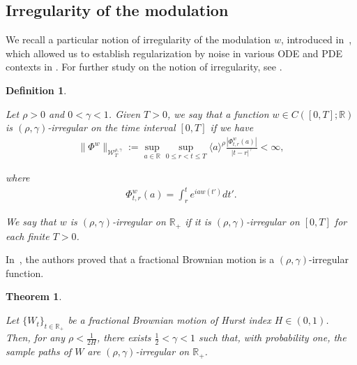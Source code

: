 \documentclass[letterpaper, 11pt,  reqno]{amsart}
\newtheorem{definition}[theorem]{Definition}
\newtheorem{oldtheorem}{Theorem}
\newcommand{\1}{\hspace{0.5mm}\text{I}\hspace{0.5mm}}
\newcommand{\noi}{\noindent}
\newcommand{\R}{\mathbb{R}}
\newcommand{\g}{\gamma}
\newcommand{\W}{\mathcal{W}}
\numberwithin{equation}{section}
\numberwithin{theorem}{section}
\begin{document}
 














\subsection{Irregularity of the modulation}

We recall a particular notion of irregularity of the modulation $w$, 
introduced in~\cite{CatellierGubinelli, CG1},
which allowed us 
 to establish regularization by noise  in various  ODE and PDE contexts
in \cite{CatellierGubinelli,CG1, CGLLO1, CGLLO2}.
For further study on the notion of irregularity, 
see  \cite{GG, RT}.



\begin{definition}
\label{DEF:ir}
\rm

Let $\rho>0$ and  $0 < \g < 1$.
Given $T > 0$, we say that a function $w\in C([0,T];\R)$ is $(\rho,\g)$-irregular 
on the time interval $[0, T]$  if we have
\begin{align}
\|\Phi^w\|_{  \W^{\rho,\g}_T} 
:= \sup_{a\in \R} \sup_{0\leq r < t\leq T} \langle a \rangle^\rho \frac{|\Phi^w_{t,r}(a)|}{|t-r|^\g} 
< \infty, 
\label{rho1}
\end{align}


\noi
where 
\begin{align}
\Phi^w_{t,r}(a)
=\int_r^t e^{i  a w(t') } d t'.
\label{rho2}
\end{align}


\noi
We say that $w$ is 
$(\rho,\g)$-irregular 
on $\R_+$  if it is 
$(\rho,\g)$-irregular 
on $[0, T]$ for each finite $T > 0$.


\end{definition}









In~\cite{CatellierGubinelli}, 
the authors proved that a fractional Brownian motion is a $(\rho,\g)$-irregular function.
 
 
\begin{oldtheorem}
\label{THM:A}

Let $\{W_t\}_{t\in \R_+}$ be a fractional Brownian motion 
of Hurst index $H\in(0,1)$.
Then, 
for any $\rho < \frac{1}{2H}$,  
there exists $\frac 12 < \g < 1$
such that,  with probability one,  the sample paths of 
$W$ are $(\rho,\g)$-irregular on $\R_+$.

\end{oldtheorem}
\end{document}

